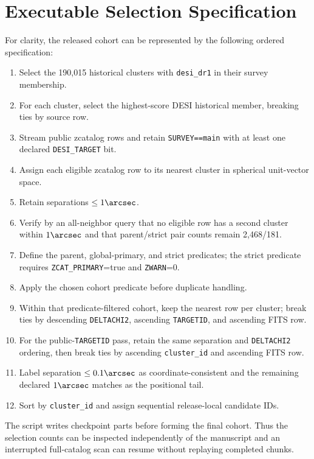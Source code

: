\documentclass[twocolumn,linenumbers]{aastex702}
\begin{document}
\clearpage
\appendix

\section{Executable Selection Specification}\label{app:selection}

For clarity, the released cohort can be represented by the following ordered specification:
\begin{enumerate}
\item Select the 190,015 historical clusters with \texttt{desi\_dr1} in their survey membership.
\item For each cluster, select the highest-score DESI historical member, breaking ties by source row.
\item Stream public zcatalog rows and retain
\texttt{SURVEY==main} with at least one declared \texttt{DESI\_TARGET} bit.
\item Assign each eligible zcatalog row to its nearest cluster in spherical unit-vector space.
\item Retain separations $\le1\arcsec$.
\item Verify by an all-neighbor query that no eligible row has a second cluster within
$1\arcsec$ and that parent/strict pair counts remain 2,468/181.
\item Define the parent, global-primary, and strict predicates; the strict predicate requires
\texttt{ZCAT\_PRIMARY}=true and \texttt{ZWARN}=0.
\item Apply the chosen cohort predicate before duplicate handling.
\item Within that predicate-filtered cohort, keep the nearest row per cluster; break ties by descending
\texttt{DELTACHI2}, ascending \texttt{TARGETID}, and ascending FITS row.
\item For the public-\texttt{TARGETID} pass, retain the same separation and \texttt{DELTACHI2}
ordering, then break ties by ascending \texttt{cluster\_id} and ascending FITS row.
\item Label separation $\le0.1\arcsec$ as coordinate-consistent and the remaining declared
$1\arcsec$ matches as the positional tail.
\item Sort by \texttt{cluster\_id} and assign sequential release-local candidate IDs.
\end{enumerate}

The script writes checkpoint parts before forming the final cohort.  Thus the selection counts
can be inspected independently of the manuscript and an interrupted full-catalog scan can resume
without replaying completed chunks.
\end{document}

